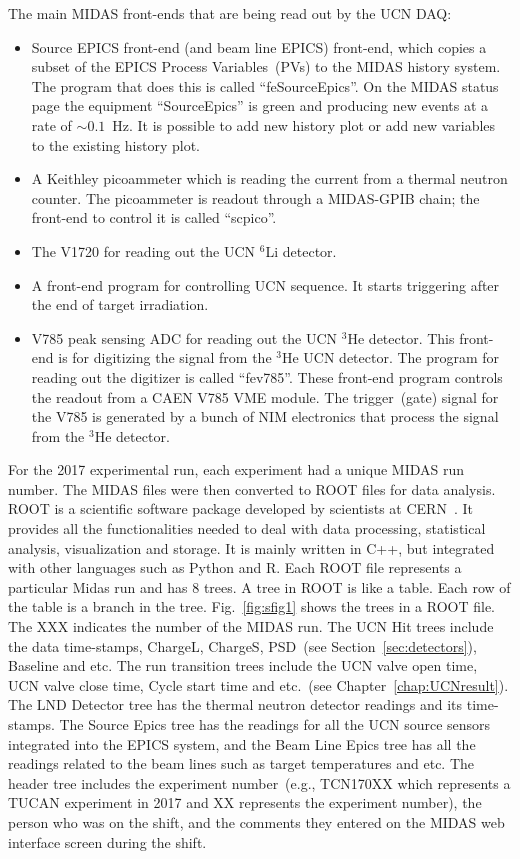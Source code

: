 The main MIDAS front-ends that are being read out by the UCN DAQ:

\begin{itemize}
\item Source EPICS front-end (and beam line EPICS) front-end, which
  copies a subset of the EPICS Process Variables~(PVs) to the MIDAS
  history system.  The program that does this is called
  ``feSourceEpics''. On the MIDAS status page the equipment
  ``SourceEpics'' is green and producing new events at a rate of
  $\sim 0.1$~Hz. It is possible to add new history plot or add new
  variables to the existing history plot.
\item A Keithley picoammeter which is reading the current from a
  thermal neutron counter. The picoammeter is readout through a
  MIDAS-GPIB chain; the front-end to control it is called ``scpico''.
\item The V1720 for reading out the UCN $^6$Li detector.
\item A front-end program for controlling UCN sequence. It starts
  triggering after the end of target irradiation.
\item V785 peak sensing ADC for reading out the UCN $^3$He detector.
  This front-end is for digitizing the signal from the $^3$He UCN
  detector.  The program for reading out the digitizer is called
  ``fev785''.  These front-end program controls the readout from a CAEN
  V785 VME module. The trigger~(gate) signal for the V785 is generated
  by a bunch of NIM electronics that process the signal from the
  $^3$He detector.
\end{itemize}

For the 2017 experimental run, each experiment had a unique MIDAS run
number. The MIDAS files were then converted to ROOT files for data
analysis. ROOT is a scientific software package developed by
scientists at CERN~\cite{brun1997root}. It provides all the
functionalities needed to deal with data processing, statistical
analysis, visualization and storage. It is mainly written in C++, but
integrated with other languages such as Python and R. Each ROOT file
represents a particular Midas run and has 8 trees. A tree in ROOT is
like a table. Each row of the table is a branch in the
tree. Fig.~\ref{fig:sfig1} shows the trees in a ROOT file. The XXX
indicates the number of the MIDAS run. The UCN Hit trees include the
data time-stamps, ChargeL, ChargeS, PSD~(see
Section~\ref{sec:detectors}), Baseline and etc. The run transition
trees include the UCN valve open time, UCN valve close time, Cycle
start time and etc.~(see Chapter~\ref{chap:UCNresult}). The LND
Detector tree has the thermal neutron detector readings and its
time-stamps. The Source Epics tree has the readings for all the UCN
source sensors integrated into the EPICS system, and the Beam Line
Epics tree has all the readings related to the beam lines such as
target temperatures and etc. The header tree includes the experiment
number~(e.g., TCN170XX which represents a TUCAN experiment in 2017 and
XX represents the experiment number), the person who was on the shift,
and the comments they entered on the MIDAS web interface screen during
the shift.

